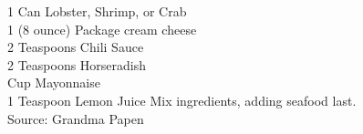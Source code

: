 {1 Can Lobster, Shrimp, or Crab \\
 1 (8 ounce) Package cream cheese \\
 2 Teaspoons Chili Sauce \\
 2 Teaspoons Horseradish \\
  Cup Mayonnaise \\
 1 Teaspoon Lemon Juice}
{Mix ingredients, adding seafood last.\\
Source: Grandma Papen}

